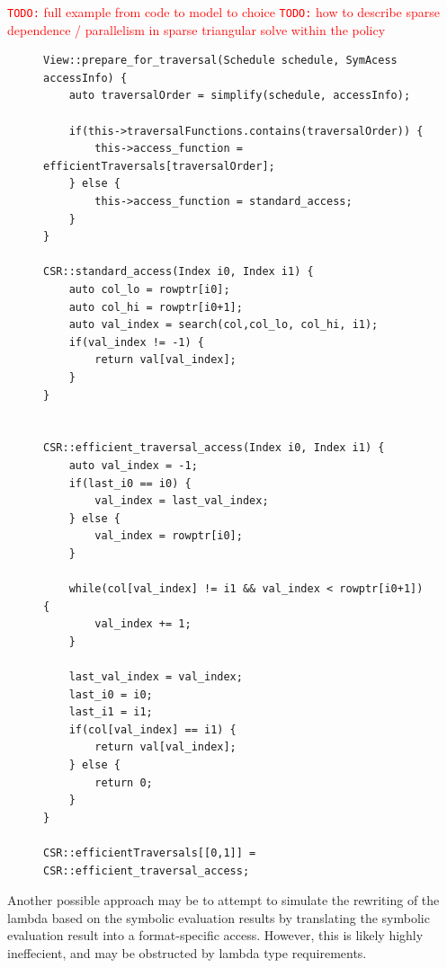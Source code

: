 \documentclass{article}
\newcommand{\todo}[1]{{\textcolor{red}{{\tt{TODO:}}\,\,#1 }}}
\begin{document}
\todo{full example from code to model to choice}
\todo{how to describe sparse dependence / parallelism in sparse triangular solve within the policy}

\begin{figure}
\begin{lstlisting}[caption={Sketch of the backend for efficient iteration}, label={BackendSketch}]
View::prepare_for_traversal(Schedule schedule, SymAcess accessInfo) {
    auto traversalOrder = simplify(schedule, accessInfo);

    if(this->traversalFunctions.contains(traversalOrder)) {
        this->access_function = efficientTraversals[traversalOrder];
    } else {
        this->access_function = standard_access;
    }
}

CSR::standard_access(Index i0, Index i1) {
    auto col_lo = rowptr[i0];
    auto col_hi = rowptr[i0+1];
    auto val_index = search(col,col_lo, col_hi, i1);
    if(val_index != -1) {
        return val[val_index];
    }
}


CSR::efficient_traversal_access(Index i0, Index i1) {
    auto val_index = -1;
    if(last_i0 == i0) {
        val_index = last_val_index;
    } else {
        val_index = rowptr[i0];
    }

    while(col[val_index] != i1 && val_index < rowptr[i0+1]) {
        val_index += 1;
    }

    last_val_index = val_index;
    last_i0 = i0;
    last_i1 = i1;
    if(col[val_index] == i1) {
        return val[val_index];
    } else {
        return 0;
    }
}

CSR::efficientTraversals[[0,1]] = CSR::efficient_traversal_access;
\end{lstlisting}
\end{figure}

Another possible approach may be to attempt to simulate the rewriting of the lambda based on the symbolic evaluation results by translating the symbolic evaluation result into a format-specific access.
However, this is likely highly ineffecient, and may be obstructed by lambda type requirements.
\end{document}
